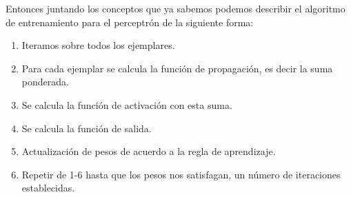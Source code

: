 Entonces juntando los conceptos que ya sabemos podemos describir el algoritmo de entrenamiento para el perceptrón de la siguiente forma:
\begin{enumerate}
 \item Iteramos sobre todos los ejemplares.
 \item Para cada ejemplar se calcula la función de propagación, es decir la suma ponderada.
 \item Se calcula la función de activación con esta suma.
 \item Se calcula la función de salida.
 \item Actualización de pesos de acuerdo a la regla de aprendizaje.
 \item Repetir de 1-6 hasta que los pesos nos satisfagan, un número de iteraciones establecidas.
\end{enumerate}



%	
%
%


